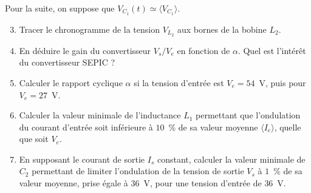 Pour la suite, on suppose que $V_{C_1}(t)\simeq\langle V_{C_1}\rangle$.

\begin{enumerate}
    \setcounter{enumi}{2}
    \item Tracer le chronogramme de la tension $V_{L_2}$ aux bornes de la bobine $L_2$.
    \item En déduire le gain du convertisseur $V_s/V_e$ en fonction de $\alpha$. Quel est l'intérêt du convertisseur SEPIC ?
    \item Calculer le rapport cyclique $\alpha$ si la tension d'entrée est $V_e=54$~V, puis pour $V_e=27$~V.
    \item Calculer la valeur minimale de l'inductance $L_1$ permettant que l'ondulation du courant d'entrée soit inférieure à $10$~\% de sa valeur moyenne $\langle I_e\rangle$, quelle que soit $V_e$.
    \item En supposant le courant de sortie $I_s$ constant, calculer la valeur minimale de $C_2$ permettant de limiter l'ondulation de la tension de sortie $V_s$ à $1$~\% de sa valeur moyenne, prise égale à $36$~V, pour une tension d'entrée de $36$~V.

\end{enumerate}

\newpage

